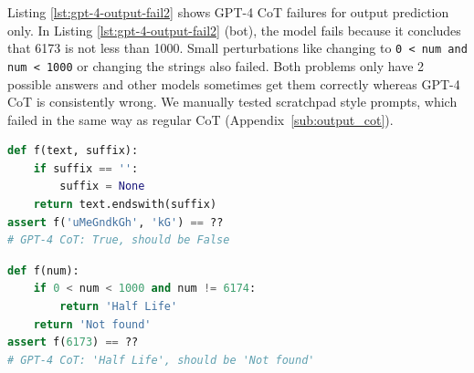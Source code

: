 \documentclass[twoside,11pt,preprint]{article}
\begin{document}



Listing \ref{lst:gpt-4-output-fail2} shows GPT-4 CoT failures for output prediction only. In Listing \ref{lst:gpt-4-output-fail2} (bot), the model fails because it concludes that 6173 is not less than 1000. Small perturbations like changing to \texttt{0 < num and num < 1000} or changing the strings also failed. Both problems only have 2 possible answers and other models sometimes get them correctly whereas GPT-4 CoT is consistently wrong. We manually tested scratchpad \cite{nye2021show} style prompts, which failed in the same way as regular CoT (Appendix~\ref{sub:output_cot}). 


\begin{lstlisting}[caption={},label={lst:gpt-4-output-fail1}, breaklines=true, language=python]
def f(text, suffix):
    if suffix == '':
        suffix = None
    return text.endswith(suffix)
assert f('uMeGndkGh', 'kG') == ??
# GPT-4 CoT: True, should be False
\end{lstlisting}
\begin{lstlisting}[caption=GPT-4 CoT output failures,label={lst:gpt-4-output-fail2}, breaklines=true, language=python]
def f(num):
    if 0 < num < 1000 and num != 6174:
        return 'Half Life'
    return 'Not found'
assert f(6173) == ??
# GPT-4 CoT: 'Half Life', should be 'Not found'
\end{lstlisting}
\end{document}
